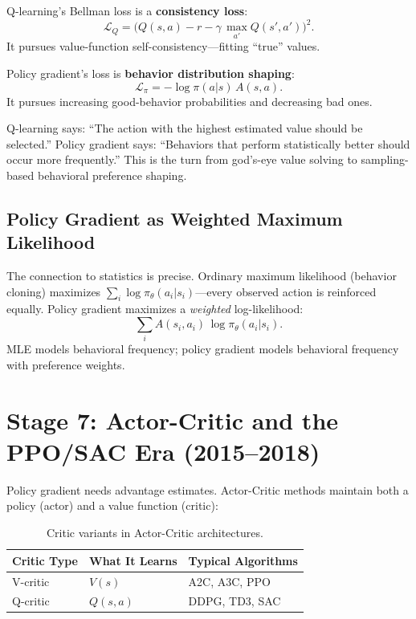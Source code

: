 Q-learning's Bellman loss is a \textbf{consistency loss}:
\begin{equation}
\mathcal{L}_Q = \bigl(Q(s,a) - r - \gamma\,\max_{a'} Q(s',a')\bigr)^2.
\end{equation}
It pursues value-function self-consistency---fitting ``true'' values.

Policy gradient's loss is \textbf{behavior distribution shaping}:
\begin{equation}
\mathcal{L}_\pi = -\log \pi(a|s)\, A(s,a).
\end{equation}
It pursues increasing good-behavior probabilities and decreasing bad ones.

\begin{keyidea}
Q-learning says: ``The action with the highest estimated value should be selected.''
Policy gradient says: ``Behaviors that perform statistically better should occur more frequently.''
This is the turn from god's-eye value solving to sampling-based behavioral preference shaping.
\end{keyidea}

\subsection{Policy Gradient as Weighted Maximum Likelihood}

The connection to statistics is precise.
Ordinary maximum likelihood (behavior cloning) maximizes $\sum_i \log \pi_\theta(a_i|s_i)$---every observed action is reinforced equally.
Policy gradient maximizes a \emph{weighted} log-likelihood:
\begin{equation}
\sum_i A(s_i, a_i)\,\log \pi_\theta(a_i|s_i).
\end{equation}
MLE models behavioral frequency; policy gradient models behavioral frequency with preference weights.

\section{Stage 7: Actor-Critic and the PPO/SAC Era (2015--2018)}
\label{sec:stage7-ac}

Policy gradient needs advantage estimates.
Actor-Critic methods maintain both a policy (actor) and a value function (critic):

\begin{table}[ht]
\centering
\caption{Critic variants in Actor-Critic architectures.}
\label{tab:critic-types}
\begin{tabular}{lll}
\toprule
\textbf{Critic Type} & \textbf{What It Learns} & \textbf{Typical Algorithms} \\
\midrule
V-critic    & $V(s)$    & A2C, A3C, PPO \\
Q-critic    & $Q(s,a)$  & DDPG, TD3, SAC \\
\bottomrule
\end{tabular}
\end{table}

